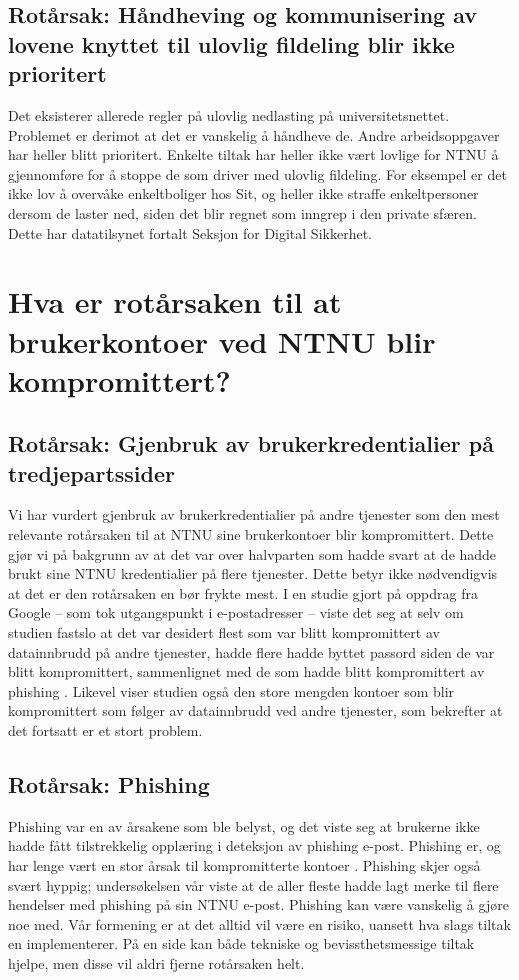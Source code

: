 \subsection*{Rotårsak: Håndheving og kommunisering av lovene knyttet til ulovlig fildeling blir ikke prioritert}
Det eksisterer allerede regler på ulovlig nedlasting på universitetsnettet. Problemet er derimot at det er vanskelig å håndheve de. Andre arbeidsoppgaver har heller blitt prioritert. Enkelte tiltak har heller ikke vært lovlige for NTNU å gjennomføre for å stoppe de som driver med ulovlig fildeling. For eksempel er det ikke lov å overvåke enkeltboliger hos Sit, og heller ikke straffe enkeltpersoner dersom de laster ned, siden det blir regnet som inngrep i den private sfæren. Dette har datatilsynet fortalt Seksjon for Digital Sikkerhet. 


\section{Hva er rotårsaken til at brukerkontoer ved NTNU blir kompromittert?}

\subsection*{Rotårsak: Gjenbruk av brukerkredentialier på tredjepartssider}
Vi har vurdert gjenbruk av brukerkredentialier på andre tjenester som den mest relevante rotårsaken til at NTNU sine brukerkontoer blir kompromittert. Dette gjør vi på bakgrunn av at det var over halvparten som hadde svart at de hadde brukt sine NTNU kredentialier på flere tjenester. Dette betyr ikke nødvendigvis at det er den rotårsaken en bør frykte mest. I en studie gjort på oppdrag fra Google – som tok utgangspunkt i e-postadresser – viste det seg at selv om studien fastslo at det var desidert flest som var blitt kompromittert av datainnbrudd på andre tjenester, hadde flere hadde byttet passord siden de var blitt kompromittert, sammenlignet med de som hadde blitt kompromittert av phishing \cite{46437}. Likevel viser studien også den store mengden kontoer som blir kompromittert som følger av datainnbrudd ved andre tjenester, som bekrefter at det fortsatt er et stort problem. 

\subsection*{Rotårsak: Phishing}
Phishing var en av årsakene som ble belyst, og det viste seg at brukerne ikke hadde fått tilstrekkelig opplæring i deteksjon av phishing e-post. Phishing er, og har lenge vært en stor årsak til kompromitterte kontoer \cite{SophPhish}. Phishing skjer også svært hyppig; undersøkelsen vår viste at de aller fleste hadde lagt merke til flere hendelser med phishing på sin NTNU e-post. Phishing kan være vanskelig å gjøre noe med. Vår formening er at det alltid vil være en risiko, uansett hva slags tiltak en implementerer. På en side kan både tekniske og bevissthetsmessige tiltak hjelpe, men disse vil aldri fjerne rotårsaken helt. 

